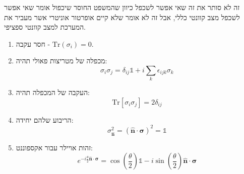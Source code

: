 \documentclass{tstextbook}
\begin{document}
\begin{remark}
זה לא סותר את זה שאי אפשר לשכפל כיוון שהמשפט החוסר שיכפול אומר שאי אפשר לשכפל מצב קוונטי כללי, אבל זה לא אומר שלא קיים אופרטור אוניטרי אשר מעביר את המערכת למצב קוונטי ספציפי.

\end{remark}
\begin{proposition}
  \begin{enumerate}
    \item חסר עקבה - \(\mathrm{Tr}\left( \sigma_{i} \right)=0\). 


    \item מכפלה של מטריצות פאולי תהיה: 
$$\sigma_{i}\sigma_{j}=\delta_{i j}\mathbb{1}+i\sum_{k}\epsilon_{i j k}\sigma_{k}$$


    \item העקבה של המכפלה תהיה: 
$$\mathrm{Tr}\left[\sigma_{i}\sigma_{j}\right]=2\delta_{i j}$$


    \item הריבוע שלהם יחידה: 
$$\sigma_{\mathbf{\hat{n}}}^{2}=\left({\hat{\mathbf{n}}}\cdot \boldsymbol\sigma\right)^{2}=\mathbb{1}$$


    \item זהות אויילר עבור אקספוננט: 
$$e^{-i{\frac{\theta}{2}}{\hat{\mathbf{n}}}\cdot\boldsymbol{\sigma}}=\cos\left({\frac{\theta}{2}}\right)\mathbb{1}-i\sin\left({\frac{\theta}{2}}\right){\hat{\mathbf{n}}}\cdot\boldsymbol\sigma$$


  \end{enumerate}
\end{proposition}
\end{document}
